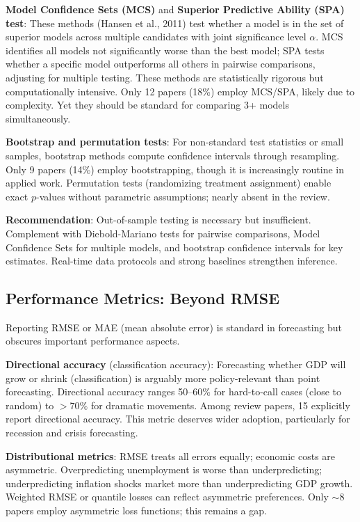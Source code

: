 \textbf{Model Confidence Sets (MCS)} and \textbf{Superior Predictive Ability (SPA) test}: These methods (Hansen et al., 2011) test whether a model is in the set of superior models across multiple candidates with joint significance level $\alpha$. MCS identifies all models not significantly worse than the best model; SPA tests whether a specific model outperforms all others in pairwise comparisons, adjusting for multiple testing. These methods are statistically rigorous but computationally intensive. Only 12 papers (18\%) employ MCS/SPA, likely due to complexity. Yet they should be standard for comparing 3+ models simultaneously.

\textbf{Bootstrap and permutation tests}: For non-standard test statistics or small samples, bootstrap methods compute confidence intervals through resampling. Only 9 papers (14\%) employ bootstrapping, though it is increasingly routine in applied work. Permutation tests (randomizing treatment assignment) enable exact $p$-values without parametric assumptions; nearly absent in the review.

\textbf{Recommendation}: Out-of-sample testing is necessary but insufficient. Complement with Diebold-Mariano tests for pairwise comparisons, Model Confidence Sets for multiple models, and bootstrap confidence intervals for key estimates. Real-time data protocols and strong baselines strengthen inference.

\subsection{Performance Metrics: Beyond RMSE}

Reporting RMSE or MAE (mean absolute error) is standard in forecasting but obscures important performance aspects.

\textbf{Directional accuracy} (classification accuracy): Forecasting whether GDP will grow or shrink (classification) is arguably more policy-relevant than point forecasting. Directional accuracy ranges 50--60\% for hard-to-call cases (close to random) to $>70\%$ for dramatic movements. Among review papers, 15 explicitly report directional accuracy. This metric deserves wider adoption, particularly for recession and crisis forecasting.

\textbf{Distributional metrics}: RMSE treats all errors equally; economic costs are asymmetric. Overpredicting unemployment is worse than underpredicting; underpredicting inflation shocks market more than underpredicting GDP growth. Weighted RMSE or quantile losses can reflect asymmetric preferences. Only $\sim$8 papers employ asymmetric loss functions; this remains a gap.

